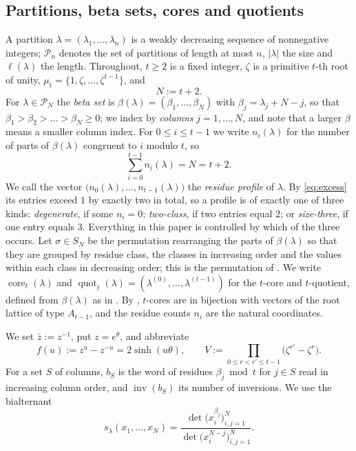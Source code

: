 \documentclass[11pt,reqno]{amsart}
\theoremstyle{plain}
\theoremstyle{definition}
\newcommand{\PP}{\mathcal{P}}
\newcommand{\zt}{\mu_t}
\newcommand{\inv}{\operatorname{inv}}
\newcommand{\core}{\operatorname{core}}
\newcommand{\quot}{\operatorname{quot}}
\newcommand{\zb}{\bar z}
\begin{document}
\subsection{Partitions, beta sets, cores and quotients}
A partition $\lambda=(\lambda_1,\dots,\lambda_n)$ is a weakly decreasing sequence of nonnegative
integers; $\PP_n$ denotes the set of partitions of length at most $n$, $|\lambda|$ the size and
$\ell(\lambda)$ the length. Throughout, $t\ge2$ is a fixed integer, $\zeta$ is a primitive $t$-th root
of unity, $\zt=\{1,\zeta,\dots,\zeta^{t-1}\}$, and
\[
N:=t+2 .
\]
For $\lambda\in\PP_N$ the \emph{beta set} is $\beta(\lambda)=(\beta_1,\dots,\beta_N)$ with
$\beta_j=\lambda_j+N-j$, so that $\beta_1>\beta_2>\dots>\beta_N\ge0$; we index by \emph{columns}
$j=1,\dots,N$, and note that a larger $\beta$ means a smaller column index. For $0\le i\le t-1$ we
write $n_i(\lambda)$ for the number of parts of $\beta(\lambda)$ congruent to $i$ modulo $t$, so
\begin{equation}\label{eq:excess}
\sum_{i=0}^{t-1}n_i(\lambda)=N=t+2 .
\end{equation}
We call the vector $\bigl(n_0(\lambda),\dots,n_{t-1}(\lambda)\bigr)$ the \emph{residue profile} of
$\lambda$. By \eqref{eq:excess} its entries exceed $1$ by exactly two in total, so a profile is of
exactly one of three kinds: \emph{degenerate}, if some $n_i=0$; \emph{two-class}, if two entries
equal $2$; or \emph{size-three}, if one entry equals $3$. Everything in this paper is controlled by
which of the three occurs.
Let $\sigma\in S_N$ be the permutation rearranging the parts of $\beta(\lambda)$ so that they are
grouped by residue class, the classes in increasing order and the values within each class in
decreasing order; this is the permutation of \cite[(2.1)]{AK25}. We write $\core_t(\lambda)$ and
$\quot_t(\lambda)=(\lambda^{(0)},\dots,\lambda^{(t-1)})$ for the $t$-core and $t$-quotient, defined
from $\beta(\lambda)$ as in \cite[\S2.1]{AK25}. By \cite{GKS90}, $t$-cores are in bijection with
vectors of the root lattice of type $A_{t-1}$, and the residue counts $n_i$ are the natural
coordinates.

We set $\zb:=z^{-1}$, put $z=e^{\theta}$, and abbreviate
\[
f(u):=z^{u}-z^{-u}=2\sinh(u\theta),\qquad
V:=\prod_{0\le r<r'\le t-1}\bigl(\zeta^{r'}-\zeta^{r}\bigr).
\]
For a set $S$ of columns, $b_S$ is the word of residues $\beta_j\bmod t$ for $j\in S$ read in
increasing column order, and $\inv(b_S)$ its number of inversions. We use the bialternant
\[
s_\lambda(x_1,\dots,x_N)=\frac{\det\bigl(x_i^{\beta_j}\bigr)_{i,j=1}^N}
{\det\bigl(x_i^{N-j}\bigr)_{i,j=1}^N}.
\]
\end{document}
